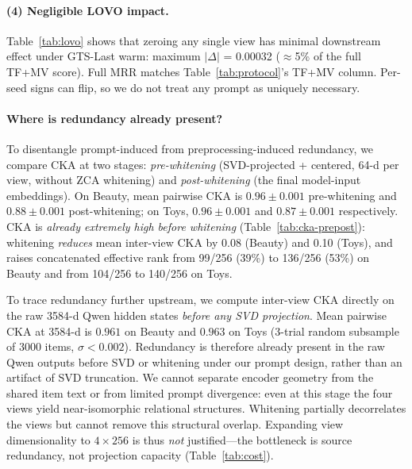 \documentclass[sigconf,natbib=true,anonymous]{acmart}
\newcommand{\tfmv}{\textsc{TF+MV}\xspace}
\begin{document}
\paragraph{(4) Negligible LOVO impact.}
Table~\ref{tab:lovo} shows that zeroing any single view has minimal downstream effect under GTS-Last warm: maximum $|\Delta|$ = 0.00032 ($\approx$5\% of the full \tfmv score).
Full MRR matches Table~\ref{tab:protocol}'s \tfmv column.
Per-seed signs can flip, so we do not treat any prompt as uniquely necessary.

\paragraph{Where is redundancy already present?}
To disentangle prompt-induced from preprocessing-induced redundancy, we compare CKA at two stages: \emph{pre-whitening} (SVD-projected + centered, 64-d per view, without ZCA whitening) and \emph{post-whitening} (the final model-input embeddings).
On Beauty, mean pairwise CKA is $0.96\pm0.001$ pre-whitening and $0.88\pm0.001$ post-whitening; on Toys, $0.96\pm0.001$ and $0.87\pm0.001$ respectively.
CKA is \emph{already extremely high before whitening} (Table~\ref{tab:cka-prepost}): whitening \emph{reduces} mean inter-view CKA by 0.08 (Beauty) and 0.10 (Toys), and raises concatenated effective rank from 99/256 (39\%) to 136/256 (53\%) on Beauty and from 104/256 to 140/256 on Toys.

To trace redundancy further upstream, we compute inter-view CKA directly on the raw 3584-d Qwen hidden states \emph{before any SVD projection}.
Mean pairwise CKA at 3584-d is $0.961$ on Beauty and $0.963$ on Toys (3-trial random subsample of 3000 items, $\sigma < 0.002$).
Redundancy is therefore already present in the raw Qwen outputs before SVD or whitening under our prompt design, rather than an artifact of SVD truncation.
We cannot separate encoder geometry from the shared item text or from limited prompt divergence: even at this stage the four views yield near-isomorphic relational structures.
Whitening partially decorrelates the views but cannot remove this structural overlap.
Expanding view dimensionality to $4\times256$ is thus \emph{not} justified---the bottleneck is source redundancy, not projection capacity (Table~\ref{tab:cost}).
\end{document}
